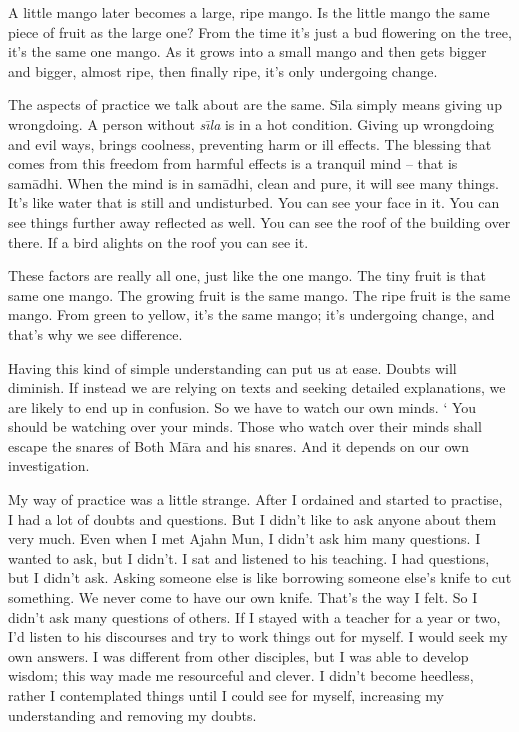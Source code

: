 A little mango later becomes a large, ripe mango. Is the little mango the same piece of fruit as the large one? From the time it's just a bud flowering on the tree, it's the same one mango. As it grows into a small mango and then gets bigger and bigger, almost ripe, then finally ripe, it's only undergoing change.

The aspects of practice we talk about are the same. S\={\i}la simply means giving up wrongdoing. A person without \textit{s\={\i}la} is in a hot condition. Giving up wrongdoing and evil ways, brings coolness, preventing harm or ill effects. The blessing that comes from this freedom from harmful effects is a tranquil mind -- that is sam\=adhi. When the mind is in sam\=adhi, clean and pure, it will see many things. It's like water that is still and undisturbed. You can see your face in it. You can see things further away reflected as well. You can see the roof of the building over there. If a bird alights on the roof you can see it.

These factors are really all one, just like the one mango. The tiny fruit is that same one mango. The growing fruit is the same mango. The ripe fruit is the same mango. From green to yellow, it's the same mango; it's undergoing change, and that's why we see difference.

Having this kind of simple understanding can put us at ease. Doubts will diminish. If instead we are relying on texts and seeking detailed explanations, we are likely to end up in confusion. So we have to watch our own minds. ` You should be watching over your minds. Those who watch over their minds shall escape the snares of  Both M\=ara and his snares. And it depends on our own investigation.

My way of practice was a little strange. After I ordained and started to practise, I had a lot of doubts and questions. But I didn't like to ask anyone about them very much. Even when I met Ajahn Mun, I didn't ask him many questions. I wanted to ask, but I didn't. I sat and listened to his teaching. I had questions, but I didn't ask. Asking someone else is like borrowing someone else's knife to cut something. We never come to have our own knife. That's the way I felt. So I didn't ask many questions of others. If I stayed with a teacher for a year or two, I'd listen to his discourses and try to work things out for myself. I would seek my own answers. I was different from other disciples, but I was able to develop wisdom; this way made me resourceful and clever. I didn't become heedless, rather I contemplated things until I could see for myself, increasing my understanding and removing my doubts.

